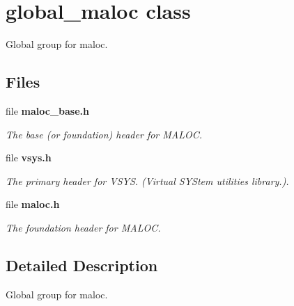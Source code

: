 \section{global\_\-maloc class}
\label{a00023}


Global group for maloc.  


\subsection*{Files}
\begin{DoxyCompactItemize}
\item 
file {\bf maloc\_\-base.h}


\begin{DoxyCompactList}\small\item\em The base (or foundation) header for MALOC. \item\end{DoxyCompactList}

\item 
file {\bf vsys.h}


\begin{DoxyCompactList}\small\item\em The primary header for VSYS. (Virtual SYStem utilities library.). \item\end{DoxyCompactList}

\item 
file {\bf maloc.h}


\begin{DoxyCompactList}\small\item\em The foundation header for MALOC. \item\end{DoxyCompactList}

\end{DoxyCompactItemize}


\subsection{Detailed Description}
Global group for maloc. 
